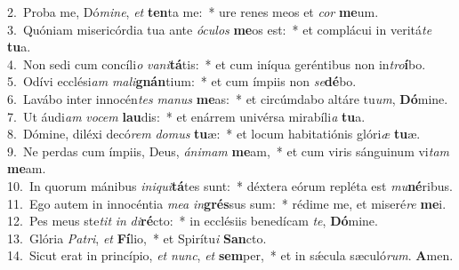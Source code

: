 {2.~}Proba me, Dó\textit{mi}\textit{ne}, \textit{et} \textbf{ten}ta me:~* ure renes meos et \textit{cor} \textbf{me}um.\\
{3.~}Quóniam misericórdia tua ante \textit{ó}\textit{cu}\textit{los} \textbf{me}os est:~* et complácui in veritá\textit{te} \textbf{tu}a.\\
{4.~}Non sedi cum concíli\textit{o} \textit{va}\textit{ni}\textbf{tá}tis:~* et cum iníqua geréntibus non in\textit{tro}\textbf{í}bo.\\
{5.~}Odívi ecclési\textit{am} \textit{ma}\textit{li}\textbf{gnán}tium:~* et cum ímpiis non \textit{se}\textbf{dé}bo.\\
{6.~}Lavábo inter innocén\textit{tes} \textit{ma}\textit{nus} \textbf{me}as:~* et circúmdabo altáre tu\textit{um}, \textbf{Dó}mine.\\
{7.~}Ut áudi\textit{am} \textit{vo}\textit{cem} \textbf{lau}dis:~* et enárrem univérsa mirabíli\textit{a} \textbf{tu}a.\\
{8.~}Dómine, diléxi decó\textit{rem} \textit{do}\textit{mus} \textbf{tu}æ:~* et locum habitatiónis glóri\textit{æ} \textbf{tu}æ.\\
{9.~}Ne perdas cum ímpiis, Deus, \textit{á}\textit{ni}\textit{mam} \textbf{me}am,~* et cum viris sánguinum vi\textit{tam} \textbf{me}am.\\
{10.~}In quorum mánibus \textit{i}\textit{ni}\textit{qui}\textbf{tá}tes sunt:~* déxtera eórum repléta est \textit{mu}\textbf{né}ribus.\\
{11.~}Ego autem in innocéntia \textit{me}\textit{a} \textit{in}\textbf{grés}sus sum:~* rédime me, et miseré\textit{re} \textbf{me}i.\\
{12.~}Pes meus ste\textit{tit} \textit{in} \textit{di}\textbf{ré}cto:~* in ecclésiis benedícam \textit{te}, \textbf{Dó}mine.\\
{13.~}Glória \textit{Pa}\textit{tri}, \textit{et} \textbf{Fí}lio,~* et Spirítu\textit{i} \textbf{San}cto.\\
{14.~}Sicut erat in princípio, \textit{et} \textit{nunc}, \textit{et} \textbf{sem}per,~* et in sǽcula sæculó\textit{rum}. \textbf{A}men.\\

